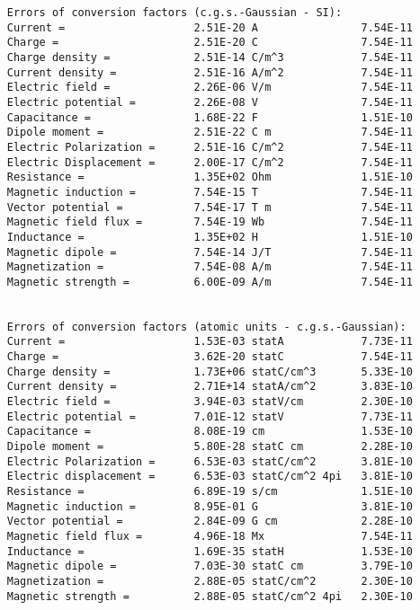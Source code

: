 \documentclass[12pt,a4paper]{article}
\begin{document}
\begin{verbatim}
     Errors of conversion factors (c.g.s.-Gaussian - SI):
     Current =                    2.51E-20 A                7.54E-11
     Charge =                     2.51E-20 C                7.54E-11
     Charge density =             2.51E-14 C/m^3            7.54E-11
     Current density =            2.51E-16 A/m^2            7.54E-11
     Electric field =             2.26E-06 V/m              7.54E-11
     Electric potential =         2.26E-08 V                7.54E-11
     Capacitance =                1.68E-22 F                1.51E-10
     Dipole moment =              2.51E-22 C m              7.54E-11
     Electric Polarization =      2.51E-16 C/m^2            7.54E-11
     Electric Displacement =      2.00E-17 C/m^2            7.54E-11
     Resistance =                 1.35E+02 Ohm              1.51E-10
     Magnetic induction =         7.54E-15 T                7.54E-11
     Vector potential =           7.54E-17 T m              7.54E-11
     Magnetic field flux =        7.54E-19 Wb               7.54E-11
     Inductance =                 1.35E+02 H                1.51E-10
     Magnetic dipole =            7.54E-14 J/T              7.54E-11
     Magnetization =              7.54E-08 A/m              7.54E-11
     Magnetic strength =          6.00E-09 A/m              7.54E-11


     Errors of conversion factors (atomic units - c.g.s.-Gaussian):
     Current =                    1.53E-03 statA            7.73E-11
     Charge =                     3.62E-20 statC            7.54E-11
     Charge density =             1.73E+06 statC/cm^3       5.33E-10
     Current density =            2.71E+14 statA/cm^2       3.83E-10
     Electric field =             3.94E-03 statV/cm         2.30E-10
     Electric potential =         7.01E-12 statV            7.73E-11
     Capacitance =                8.08E-19 cm               1.53E-10
     Dipole moment =              5.80E-28 statC cm         2.28E-10
     Electric Polarization =      6.53E-03 statC/cm^2       3.81E-10
     Electric displacement =      6.53E-03 statC/cm^2 4pi   3.81E-10
     Resistance =                 6.89E-19 s/cm             1.51E-10
     Magnetic induction =         8.95E-01 G                3.81E-10
     Vector potential =           2.84E-09 G cm             2.28E-10
     Magnetic field flux =        4.96E-18 Mx               7.54E-11
     Inductance =                 1.69E-35 statH            1.53E-10
     Magnetic dipole =            7.03E-30 statC cm         3.79E-10
     Magnetization =              2.88E-05 statC/cm^2       2.30E-10
     Magnetic strength =          2.88E-05 statC/cm^2 4pi   2.30E-10


\end{verbatim}
\end{document}
